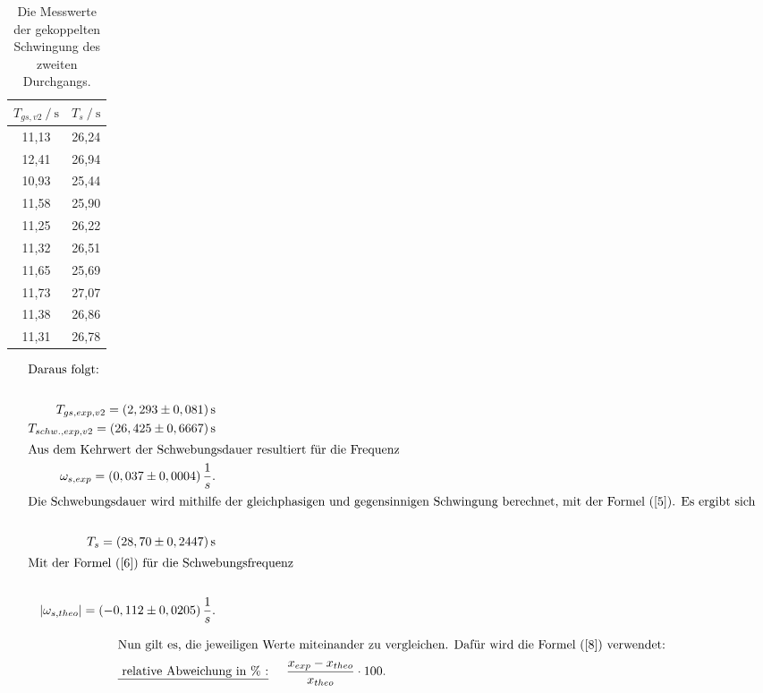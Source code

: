 \begin{table}[H]
    \centering
    \caption{Die Messwerte der gekoppelten Schwingung des zweiten Durchgangs.}
    \label{Tabelle7}
    \begin{tabular} {c  c}
        \toprule
        {$ T_{gs,v2} \mathbin{/} \unit{\second}$} &
        {$ T_{s} \mathbin{/} \unit{\second}$} \\
        \midrule
         11,13 & 26,24 \\
         12,41 & 26,94 \\
         10,93 & 25,44 \\
         11,58 & 25,90 \\
         11,25 & 26,22 \\
         11,32 & 26,51 \\
         11,65 & 25,69 \\
         11,73 & 27,07 \\
         11,38 & 26,86 \\
         11,31 & 26,78 \\
        \bottomrule
    \end{tabular} 
\end{table}

\begin{align*}
    \intertext{Daraus folgt:}\\
    T_{gs,exp,v2} = (2,293 \pm 0,081 )\, \unit{\second}\\
    T_{schw.,exp,v2} = (26,425 \pm 0,6667)\, \unit{\second}\\
    \intertext{Aus dem Kehrwert der Schwebungsdauer resultiert für die Frequenz}
    \omega_{s,exp} = (0,037 \pm 0,0004 )\, \frac{1}{s}. \\
    \intertext{Die Schwebungsdauer wird mithilfe der gleichphasigen und gegensinnigen Schwingung berechnet, mit der Formel (\ref{5}). Es ergibt sich}\\
    T_{s} = (28,70 \pm 0,2447 )\, \unit{\second}\\
    \intertext{Mit der Formel (\ref{6}) für die Schwebungsfrequenz}\\
    \left\lvert \omega_{s,theo} \right\rvert = (-0,112 \pm 0,0205 )\, \frac{1}{s}.\\
\end{align*}

\begin{align}
    \intertext{Nun gilt es, die jeweiligen Werte miteinander zu vergleichen. 
    Dafür wird die Formel (\ref{8}) verwendet:}
    \text{\underline{ relative Abweichung in \% :}} \hspace{0.5cm} \frac{x_{exp} - x_{theo} }{x_{theo}} \cdot 100. \label{8}
\end{align}
